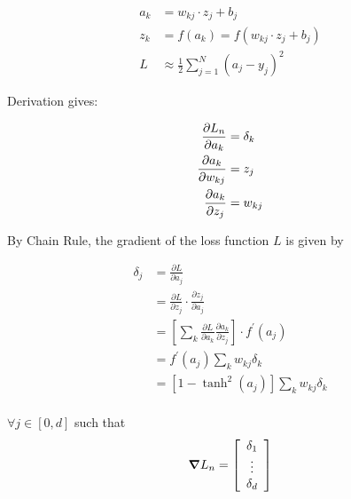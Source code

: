 \documentclass[10pt]{article}
\begin{document}
\begin{align*}
  a_k &= w_{kj}\cdot z_j + b_j\\
  z_k &= f(a_k) = f(w_{kj}\cdot z_j + b_j)\\
  L &\approx \frac{1}{2}\sum_{j=1}^{N}(a_j-y_j)^2
\end{align*}

Derivation gives:


\begin{align*}
  \pdv{L_n}{a_k} &= \delta_k\\
  \pdv{a_k}{w_{kj}} &= z_{j}\\
  \pdv{a_k}{z_j} &= w_{kj}
\end{align*}


By Chain Rule, the gradient of the loss function $L$ is given by


\begin{align*}
\delta_{j}&=\frac{\partial L}{\partial a_{j}}\\&=\frac{\partial L}{\partial z_{j}} \cdot \frac{\partial z_{j}}{\partial a_{j}}\\&=\left[\sum_{k} \frac{\partial L}{\partial a_{k}} \frac{\partial a_{k}}{\partial z_{j}}\right] \cdot f^{\prime}\left(a_{j}\right)\\
&=f^{\prime}\left(a_{j}\right) \sum_{k} w_{kj}\delta_k\\
&=\left[1-\tanh^2(a_{j})\right] \sum_{k} w_{kj}\delta_k\\
\end{align*}

$\forall j\in[0,d]$ such that  $$\grad L_n = \left[\begin{array}{c}
  \delta_1 \\
  \vdots \\
  \delta_d
  \end{array}\right]$$
\end{document}
